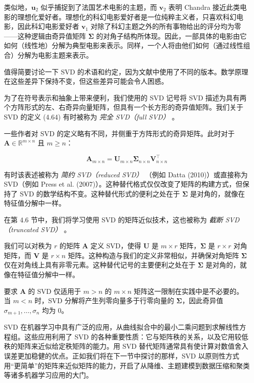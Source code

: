 \begin{notebox}
类似地，$ \boldsymbol{u}_2 $ 似乎捕捉到了法国艺术电影的主题，而 $ \boldsymbol{v}_2 $ 表明 Chandra 接近此类电影的理想化爱好者。理想化的科幻电影爱好者是一位纯粹主义者，只喜欢科幻电影，因此科幻电影爱好者 $ \boldsymbol{v}_1 $ 对除了科幻主题之外的所有事物给出的评分均为零——这种逻辑由奇异值矩阵 $ \boldsymbol{\Sigma} $ 的对角子结构所体现。因此，一部具体的电影由它如何（线性地）分解为典型电影来表示。同样，一个人将由他们如何（通过线性组合）分解为电影主题来表示。
\end{notebox}

值得简要讨论一下 SVD 的术语和约定，因为文献中使用了不同的版本。数学原理在这些差异下保持不变，但这些差异可能会令人困惑。

为了在符号表示和抽象上带来便利，我们使用的 SVD 记号将 SVD 描述为具有两个方阵形式的左、右奇异向量矩阵，但具有一个长方形的奇异值矩阵。我们关于 SVD 的定义 (4.64) 有时被称为 \emph{完全 SVD（full SVD）} 。

一些作者对 SVD 的定义略有不同，并侧重于方阵形式的奇异矩阵。此时对于 $ \boldsymbol{A} \in \mathbb{R}^{m \times n} $ 且 $ m \ge n $：

\begin{equation}
\boldsymbol{A}_{m \times n} = \boldsymbol{U}_{m \times n} \boldsymbol{\Sigma}_{n \times n} \boldsymbol{V}^\top_{n \times n}
\tag{4.89}\label{eq:4-89}
\end{equation}

有时该表述被称为 \emph{简约 SVD（reduced SVD）} （例如 Datta (2010)）或直接称为 SVD（例如 Press et al. (2007)）。这种替代格式仅仅改变了矩阵的构建方式，但保持了 SVD 的数学结构不变。这种替代形式的便利之处在于 $ \boldsymbol{\Sigma} $ 是对角的，就像在特征值分解中一样。

在第 4.6 节中，我们将学习使用 SVD 的矩阵近似技术，这也被称为 \emph{截断 SVD（truncated SVD）} 。

我们可以对秩为 $ r $ 的矩阵 $ \boldsymbol{A} $ 定义 SVD，使得 $ \boldsymbol{U} $ 是 $ m \times r $ 矩阵，$ \boldsymbol{\Sigma} $ 是 $ r \times r $ 对角矩阵，而 $ \boldsymbol{V} $ 是 $ r \times n $ 矩阵。这种构造与我们的定义非常相似，并确保对角矩阵 $ \boldsymbol{\Sigma} $ 仅在对角线上具有非零元素。这种替代记号的主要便利之处在于 $ \boldsymbol{\Sigma} $ 是对角的，就像在特征值分解中一样。

要求 $ \boldsymbol{A} $ 的 SVD 仅适用于 $ m > n $ 的 $ m \times n $ 矩阵这一限制在实践中是不必要的。当 $ m < n $ 时，SVD 分解将产生列零向量多于行零向量的 $ \boldsymbol{\Sigma} $，因此奇异值 $ \sigma_{m+1}, \ldots, \sigma_n $ 均为 0。

SVD 在机器学习中具有广泛的应用，从曲线拟合中的最小二乘问题到求解线性方程组。这些应用利用了 SVD 的各种重要性质：它与矩阵秩的关系，以及它用较低秩的矩阵来近似给定秩矩阵的能力。用 SVD 替代矩阵通常具有使计算对数值舍入误差更加稳健的优点。正如我们将在下一节中探讨的那样，SVD 以原则性方式用“更简单”的矩阵来近似矩阵的能力，开启了从降维、主题建模到数据压缩和聚类等诸多机器学习应用的大门。
